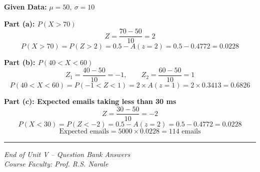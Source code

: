 \documentclass[12pt,a4paper]{article}
\begin{document}
\textbf{Given Data:} $\mu = 50,\ \sigma = 10$

\textbf{Part (a): $P(X > 70)$}
\[
Z = \frac{70-50}{10} = 2
\]
\[
P(X > 70) = P(Z > 2) = 0.5 - A(z=2) = 0.5 - 0.4772 = \boxed{0.0228}
\]

\textbf{Part (b): $P(40 < X < 60)$}
\[
Z_1 = \frac{40-50}{10} = -1, \qquad Z_2 = \frac{60-50}{10} = 1
\]
\[
P(40 < X < 60) = P(-1 < Z < 1) = 2 \times A(z=1) = 2 \times 0.3413 = \boxed{0.6826}
\]

\textbf{Part (c): Expected emails taking less than 30 ms}
\[
Z = \frac{30-50}{10} = -2
\]
\[
P(X < 30) = P(Z < -2) = 0.5 - A(z=2) = 0.5 - 0.4772 = 0.0228
\]
\[
\text{Expected emails} = 5000 \times 0.0228 = \boxed{114 \text{ emails}}
\]

\vspace{2em}
\hrule
\begin{center}
\textit{End of Unit V -- Question Bank Answers}\\
\textit{Course Faculty: Prof. R.S. Narale}
\end{center}
\end{document}
